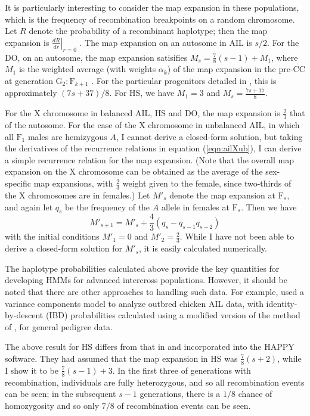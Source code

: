 \documentclass[12pt,letterpaper,pdftex]{article}
\begin{document}
It is particularly interesting to consider the map expansion in these
populations, which is the frequency of recombination breakpoints on a
random chromosome.  Let $R$ denote the probability of a recombinant
haplotype; then the map expansion is $\left. \frac{dR}{dr}
\right|_{r=0}$ \citep[see][]{Teuscher2007}.  The map expansion on an
autosome in AIL is $s/2$.  For the DO, on an autosome, the map
expansion satisifies $M_s = \frac{7}{8}(s-1) + M_1$, where $M_1$ is
the weighted average (with weights $\alpha_k$) of the map expansion in
the pre-CC at generation $\text{G}_2:\text{F}_{k+1}$
\citep[see][Table~4]{Broman2012}.  For the particular progenitors detailed
in \citet[Figure~1]{Svenson2012}, this is approximately $(7s+37)/8$.  For HS, we have
$M_1 = 3$ and $M_s = \frac{7s+17}{8}$.

For the X chromosome in balanced AIL, HS and DO, the map expansion is
$\frac{2}{3}$ that of the autosome.  For the case of the X chromosome in
unbalanced AIL, in which all $\text{F}_1$ males are hemizygous $A$, I
cannot derive a closed-form solution, but taking the derivatives of
the recurrence relations in equation (\ref{eqn:ailXub}), I can derive
a simple recurrence relation for the map expansion.  (Note that the
overall map expansion on the X chromosome can be obtained as the
average of the sex-specific map expansions, with $\frac{2}{3}$ weight
given to the female, since two-thirds of the X chromosomes are in females.)
Let $M'_s$ denote the map expansion at
$\text{F}_s$, and again let $q_s$ be the frequency of the $A$ allele
in females at $\text{F}_s$.  Then we have
\begin{equation}
M'_{s+1} = \textstyle{ M'_s + \frac{4}{3}(q_s - q_{s-1} q_{s-2}) }
\end{equation}
with the initial conditions $M'_1 = 0$ and $M'_2 = \frac{2}{3}$.
While I have not been able to derive a closed-form solution for
$M'_s$, it is easily calculated numerically.  

The haplotype probabilities calculated above provide the key
quantities for developing HMMs for advanced intercross populations.
However, it should be noted that there are other approaches to
handling such data.  For example, \citet{Besnier2011} used a variance
components model to analyze outbred chicken AIL data, with
identity-by-descent (IBD) probabilities calculated using a modified
version of the method of \citet{PongWong2001}, for general pedigree
data.

The above result for HS differs from that in \citet{Mott2000} and
incorporated into the HAPPY software.  They had assumed that the map
expansion in HS was $\frac{7}{8}(s+2)$, while I show it
to be $\frac{7}{8}(s-1) + 3$.  In the first three of generations with
recombination, individuals are fully heterozygous, and so all
recombination events can be seen; in the subsequent $s-1$ generations,
there is a $1/8$ chance of homozygosity and so only $7/8$ of
recombination events can be seen.
\end{document}
